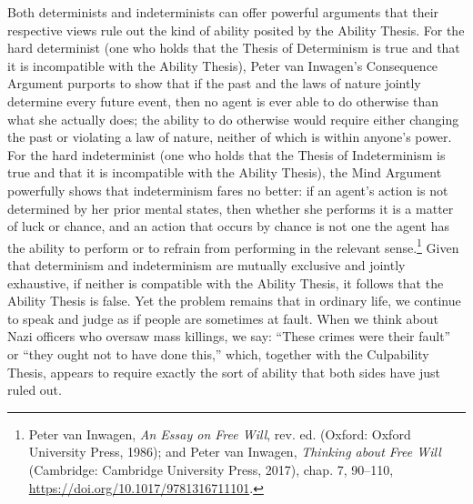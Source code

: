 \noindent Both determinists and indeterminists can offer powerful arguments that
their respective views rule out the kind of ability posited by the
Ability Thesis. For the hard determinist (one who holds that the Thesis
of Determinism is true and that it is incompatible with the Ability
Thesis), Peter van Inwagen's Consequence Argument purports to show that
if the past and the laws of nature jointly determine every future event,
then no agent is ever able to do otherwise than what she actually does;
the ability to do otherwise would require either changing the past or
violating a law of nature, neither of which is within anyone's power.
For the hard indeterminist (one who holds that the Thesis of
Indeterminism is true and that it is incompatible with the Ability
Thesis), the Mind Argument powerfully shows that indeterminism fares no
better: if an agent's action is not determined by her prior mental
states, then whether she performs it is a matter of luck or chance, and
an action that occurs by chance is not one the agent has the ability to
perform or to refrain from performing in the relevant sense.\footnote{Peter
  van Inwagen, \emph{An Essay on Free Will}, rev. ed. (Oxford: Oxford
  University Press, 1986); and Peter van Inwagen, \emph{Thinking about
  Free Will} (Cambridge: Cambridge University Press, 2017), chap. 7,
  90--110, \url{https://doi.org/10.1017/9781316711101}.} Given that
determinism and indeterminism are mutually exclusive and jointly
exhaustive, if neither is compatible with the Ability Thesis, it follows
that the Ability Thesis is false. Yet the problem remains that in
ordinary life, we continue to speak and judge as if people are sometimes
at fault. When we think about Nazi officers who oversaw mass killings,
we say: ``These crimes were their fault'' or ``they ought not to have
done this,'' which, together with the Culpability Thesis, appears to
require exactly the sort of ability that both sides have just ruled out.

